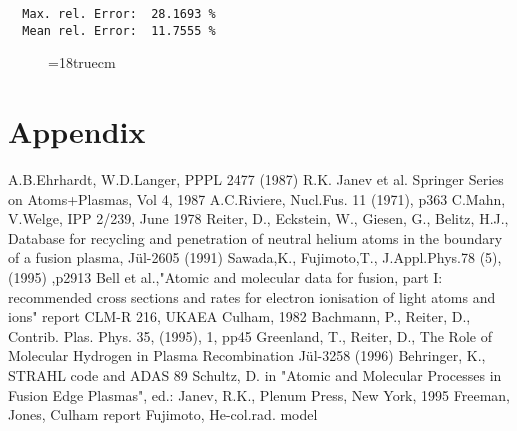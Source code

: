 \begin{verbatim}
  Max. rel. Error:  28.1693 %
  Mean rel. Error:  11.7555 %
\end{verbatim}
\begin{figure} \label{2.0c}
\epsfxsize=18truecm
\end{figure}
\newpage

\section{Appendix}
\newpage
\begin{thebibliography}{99}
  A.B.Ehrhardt, W.D.Langer, PPPL 2477 (1987)
 R.K. Janev et al.  Springer Series on Atoms+Plasmas,
                   Vol 4, 1987
 A.C.Riviere, Nucl.Fus. 11 (1971), p363
 C.Mahn, V.Welge, IPP 2/239, June 1978
 Reiter, D., Eckstein, W., Giesen, G., Belitz,
                    H.J.,
                    Database for recycling and penetration of neutral
                    helium atoms in the boundary of a fusion plasma,
                    J\"ul-2605 (1991)
 Sawada,K.,  Fujimoto,T., J.Appl.Phys.78 (5), (1995)
                    ,p2913
  Bell et al.,"Atomic and molecular data for fusion, part I:
recommended cross sections and rates for electron ionisation of light atoms and ions"
 report CLM-R 216, UKAEA Culham, 1982
  Bachmann, P., Reiter, D., Contrib. Plas. Phys.
                       35, (1995), 1, pp45
 Greenland, T., Reiter, D.,
                    The Role of Molecular Hydrogen in Plasma
                    Recombination
                    J\"ul-3258 (1996)
 Behringer, K., STRAHL code and ADAS 89
 Schultz, D. in "Atomic and Molecular Processes in Fusion
                     Edge Plasmas", ed.: Janev, R.K., Plenum Press, New York, 1995
 Freeman, Jones, Culham report
 Fujimoto, He-col.rad. model
 \end{thebibliography}

